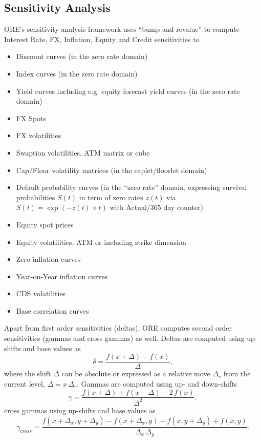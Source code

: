 \documentclass[12pt, a4paper]{article}
\begin{document}
\begin{appendix}
\subsection{Sensitivity Analysis}\label{sec:app_sensi}

ORE's sensitivity analysis framework uses ``bump and revalue'' to compute Interest Rate, FX, Inflation, Equity and Credit sensitivities to
\begin{itemize}
\item Discount curves  (in the zero rate domain)
\item Index curves (in the zero rate domain)
\item Yield curves including e.g. equity forecast yield curves (in the zero rate domain)
\item FX Spots
\item FX volatilities
\item Swaption volatilities, ATM matrix or cube 
\item Cap/Floor volatility matrices (in the caplet/floorlet domain)
\item Default probability curves (in the ``zero rate'' domain, expressing survival probabilities $S(t)$ in term of zero rates $z(t)$ via $S(t)=\exp(-z(t)\times t)$ with Actual/365 day counter)
\item Equity spot prices
\item Equity volatilities, ATM or including strike dimension 
\item Zero inflation curves
\item Year-on-Year inflation curves
\item CDS volatilities
\item Base correlation curves
\end{itemize}

Apart from first order sensitivities (deltas), ORE computes second order sensitivities (gammas and cross gammas) as well. Deltas are computed using up-shifts and base values as
$$
\delta = \frac{f(x+\Delta)-f(x)}{\Delta},
$$ 
where the shift $\Delta$ can be absolute or expressed as a relative move $\Delta_r$ from the current level, $\Delta=x\,\Delta_r$. Gammas are computed using up- and down-shifts
$$
\gamma = \frac{f(x+\Delta)+f(x-\Delta) - 2\,f(x)}{\Delta^2},
$$ 
cross gammas using up-shifts and base values as
$$
\gamma_{cross} = \frac{f(x+\Delta_x,y+\Delta_y)-f(x+\Delta_x,y) -f(x,y+\Delta_y) + f(x,y)}{\Delta_x\,\Delta_y}.
$$ 


\end{appendix}
\end{document}
